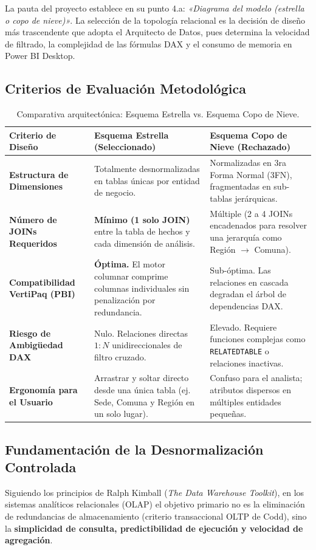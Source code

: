 \documentclass[11pt,a4paper]{article}
\begin{document}
La pauta del proyecto establece en su punto 4.a: \textit{«Diagrama del modelo (estrella o copo de nieve)»}. La selección de la topología relacional es la decisión de diseño más trascendente que adopta el Arquitecto de Datos, pues determina la velocidad de filtrado, la complejidad de las fórmulas DAX y el consumo de memoria en Power BI Desktop.

\subsection{Criterios de Evaluación Metodológica}

\begin{table}[h!]
\centering
\small
\begin{tabularx}{\textwidth}{lYY}
\toprule
\textbf{Criterio de Diseño} & \textbf{Esquema Estrella (Seleccionado)} & \textbf{Esquema Copo de Nieve (Rechazado)} \\
\midrule
\textbf{Estructura de Dimensiones} & Totalmente desnormalizadas en tablas únicas por entidad de negocio. & Normalizadas en 3ra Forma Normal (3FN), fragmentadas en sub-tablas jerárquicas. \\
\textbf{Número de JOINs Requeridos} & \textbf{Mínimo (1 solo JOIN)} entre la tabla de hechos y cada dimensión de análisis. & Múltiple (2 a 4 JOINs encadenados para resolver una jerarquía como Región $\rightarrow$ Comuna). \\
\textbf{Compatibilidad VertiPaq (PBI)} & \textbf{Óptima.} El motor columnar comprime columnas individuales sin penalización por redundancia. & Sub-óptima. Las relaciones en cascada degradan el árbol de dependencias DAX. \\
\textbf{Riesgo de Ambigüedad DAX} & Nulo. Relaciones directas $1:N$ unidireccionales de filtro cruzado. & Elevado. Requiere funciones complejas como \texttt{RELATEDTABLE} o relaciones inactivas. \\
\textbf{Ergonomía para el Usuario} & Arrastrar y soltar directo desde una única tabla (ej. Sede, Comuna y Región en un solo lugar). & Confuso para el analista; atributos dispersos en múltiples entidades pequeñas. \\
\bottomrule
\end{tabularx}
\caption{Comparativa arquitectónica: Esquema Estrella vs. Esquema Copo de Nieve.}
\label{tab:estrella_vs_copo}
\end{table}

\subsection{Fundamentación de la Desnormalización Controlada}
Siguiendo los principios de Ralph Kimball (\textit{The Data Warehouse Toolkit}), en los sistemas analíticos relacionales (OLAP) el objetivo primario no es la eliminación de redundancias de almacenamiento (criterio transaccional OLTP de Codd), sino la \textbf{simplicidad de consulta, predictibilidad de ejecución y velocidad de agregación}. 
\end{document}
